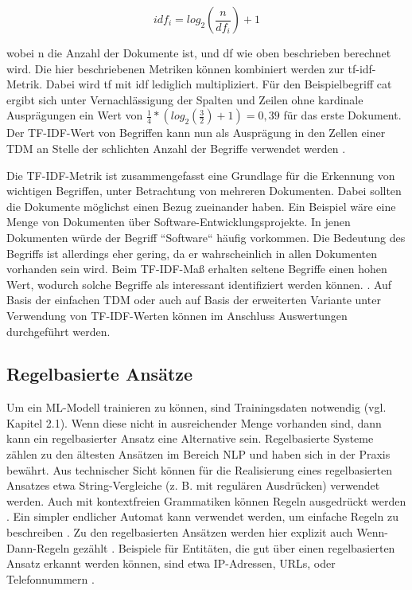 \[ idf_i = log_2( \frac{n}{df_i}) + 1 \]

wobei n die Anzahl der Dokumente ist, und df wie oben beschrieben berechnet wird. Die hier beschriebenen Metriken können kombiniert werden zur tf-idf-Metrik. Dabei wird tf mit idf lediglich multipliziert. Für den Beispielbegriff cat ergibt sich unter Vernachlässigung der Spalten und Zeilen ohne kardinale Ausprägungen ein Wert von \( \frac{1}{4} * (log_2( \frac{3}{2} )+1)=0,39 \) 
für das erste Dokument. Der TF-IDF-Wert von Begriffen kann nun als Ausprägung in den Zellen einer TDM an Stelle der schlichten Anzahl der Begriffe verwendet werden \cite[S. 61-73]{Anandarajan}.

Die TF-IDF-Metrik ist zusammengefasst eine Grundlage für die Erkennung von wichtigen Begriffen, unter Betrachtung von mehreren Dokumenten. Dabei sollten die Dokumente möglichst einen Bezug zueinander haben. Ein Beispiel wäre eine Menge von Dokumenten über Software-Entwicklungsprojekte. In jenen Dokumenten würde der Begriff ``Software`` häufig vorkommen. Die Bedeutung des Begriffs ist allerdings eher gering, da er wahrscheinlich in allen Dokumenten vorhanden sein wird. Beim TF-IDF-Maß erhalten seltene Begriffe einen hohen Wert, wodurch solche Begriffe als interessant identifiziert werden können. \cite[S. 107-110]{Manning}. Auf Basis der einfachen TDM oder auch auf Basis der erweiterten Variante unter Verwendung von TF-IDF-Werten können im Anschluss Auswertungen durchgeführt werden.

\subsection{Regelbasierte Ansätze}

Um ein ML-Modell trainieren zu können, sind Trainingsdaten notwendig (vgl. Kapitel 2.1). Wenn diese nicht in ausreichender Menge vorhanden sind, dann kann ein regelbasierter Ansatz eine Alternative sein. Regelbasierte Systeme zählen zu den ältesten Ansätzen im Bereich NLP und haben sich in der Praxis bewährt. Aus technischer Sicht können für die Realisierung eines regelbasierten Ansatzes etwa String-Vergleiche (z. B. mit regulären Ausdrücken) verwendet werden. Auch mit kontextfreien Grammatiken können Regeln ausgedrückt werden \cite{kaggle}. Ein simpler endlicher Automat kann verwendet werden, um einfache Regeln zu beschreiben \cite[S. 219]{Manning}. Zu den regelbasierten Ansätzen werden hier explizit auch Wenn-Dann-Regeln gezählt \cite[S. 23ff.]{Ertel}. Beispiele für Entitäten, die gut über einen regelbasierten Ansatz erkannt werden können, sind etwa IP-Adressen, URLs, oder Telefonnummern \cite{spacy}.

